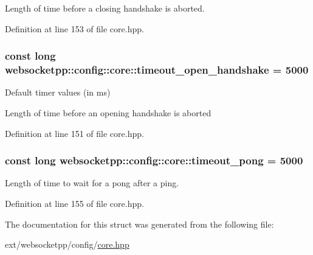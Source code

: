 Length of time before a closing handshake is aborted. 



Definition at line 153 of file core.\+hpp.

\hypertarget{structwebsocketpp_1_1config_1_1core_a48b8736d5603bf1b629c1aff75939515}{}
\subsubsection[{timeout\+\_\+open\+\_\+handshake}]{\setlength{\rightskip}{0pt plus 5cm}const long websocketpp\+::config\+::core\+::timeout\+\_\+open\+\_\+handshake = 5000\hspace{0.3cm}{\ttfamily [static]}}\label{structwebsocketpp_1_1config_1_1core_a48b8736d5603bf1b629c1aff75939515}


Default timer values (in ms) 

Length of time before an opening handshake is aborted 

Definition at line 151 of file core.\+hpp.

\hypertarget{structwebsocketpp_1_1config_1_1core_ac92c4ded9c804e2d0280f400fb51600d}{}
\subsubsection[{timeout\+\_\+pong}]{\setlength{\rightskip}{0pt plus 5cm}const long websocketpp\+::config\+::core\+::timeout\+\_\+pong = 5000\hspace{0.3cm}{\ttfamily [static]}}\label{structwebsocketpp_1_1config_1_1core_ac92c4ded9c804e2d0280f400fb51600d}


Length of time to wait for a pong after a ping. 



Definition at line 155 of file core.\+hpp.



The documentation for this struct was generated from the following file\+:\begin{DoxyCompactItemize}
\item 
ext/websocketpp/config/\hyperlink{core_8hpp}{core.\+hpp}\end{DoxyCompactItemize}
